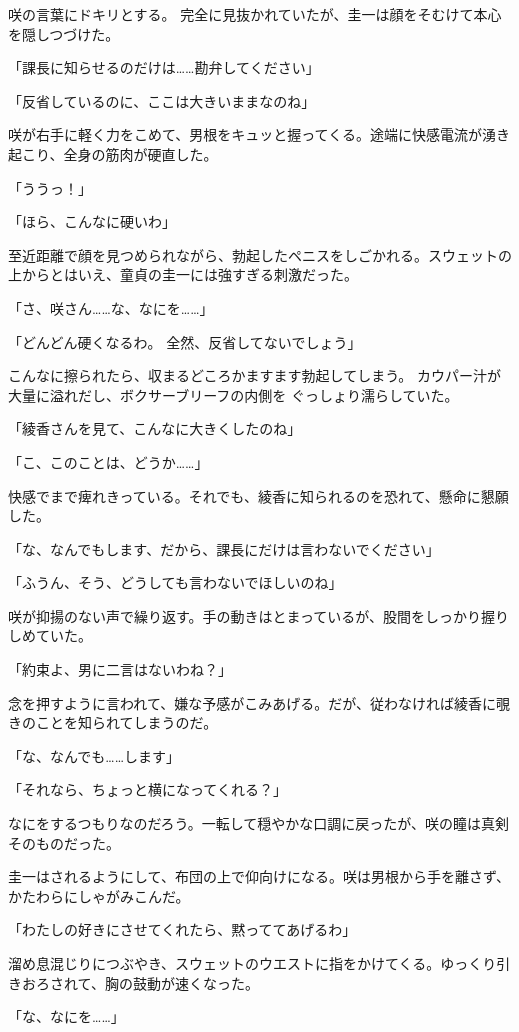 ﻿\documentclass[
    book,tate,
    line_length=30zw,
    jafontsize=12pt,
    paper=b5j,
    landscape,
    ]{jlreq}
\begin{document}
咲の言葉にドキリとする。 完全に見抜かれていたが、圭一は顔をそむけて本心を隠しつづけた。

「課長に知らせるのだけは……勘弁してください」

「反省しているのに、ここは大きいままなのね」

咲が右手に軽く力をこめて、男根をキュッと握ってくる。途端に快感電流が湧き起こり、全身の筋肉が硬直した。

「ううっ！」

「ほら、こんなに硬いわ」

至近距離で顔を見つめられながら、勃起したペニスをしごかれる。スウェットの上からとはいえ、童貞の圭一には強すぎる刺激だった。

「さ、咲さん……な、なにを……」

「どんどん硬くなるわ。 全然、反省してないでしょう」

こんなに擦られたら、収まるどころかますます勃起してしまう。 カウパー汁が大量に溢れだし、ボクサーブリーフの内側を
ぐっしょり濡らしていた。

「綾香さんを見て、こんなに大きくしたのね」

「こ、このことは、どうか……」

快感でまで痺れきっている。それでも、綾香に知られるのを恐れて、懸命に懇願した。

「な、なんでもします、だから、課長にだけは言わないでください」

「ふうん、そう、どうしても言わないでほしいのね」

咲が抑揚のない声で繰り返す。手の動きはとまっているが、股間をしっかり握りしめていた。

「約束よ、男に二言はないわね？」

念を押すように言われて、嫌な予感がこみあげる。だが、従わなければ綾香に覗きのことを知られてしまうのだ。

「な、なんでも……します」

「それなら、ちょっと横になってくれる？」

なにをするつもりなのだろう。一転して穏やかな口調に戻ったが、咲の瞳は真剣そのものだった。

圭一はされるようにして、布団の上で仰向けになる。咲は男根から手を離さず、かたわらにしゃがみこんだ。

「わたしの好きにさせてくれたら、黙っててあげるわ」

溜め息混じりにつぶやき、スウェットのウエストに指をかけてくる。ゆっくり引きおろされて、胸の鼓動が速くなった。

「な、なにを……」
\end{document}
